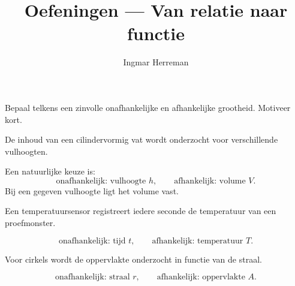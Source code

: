 \documentclass{ximera}
\title{Oefeningen — Van relatie naar functie}
\author{Ingmar Herreman}
\begin{document}









\maketitle

\FVDbeginExercises




\begin{oefening}{\oefB\ESS}

Bepaal telkens een zinvolle onafhankelijke en afhankelijke grootheid.
Motiveer kort.

\begin{question}
De inhoud van een cilindervormig vat wordt onderzocht voor verschillende
vulhoogten.

\begin{oplossing}
Een natuurlijke keuze is:
\[
\text{onafhankelijk: vulhoogte }h,
\qquad
\text{afhankelijk: volume }V.
\]
Bij een gegeven vulhoogte ligt het volume vast.
\end{oplossing}
\end{question}

\begin{question}
Een temperatuursensor registreert iedere seconde de temperatuur van een proefmonster.

\begin{oplossing}
\[
\text{onafhankelijk: tijd }t,
\qquad
\text{afhankelijk: temperatuur }T.
\]
\end{oplossing}
\end{question}

\begin{question}
Voor cirkels wordt de oppervlakte onderzocht in functie van de straal.

\begin{oplossing}
\[
\text{onafhankelijk: straal }r,
\qquad
\text{afhankelijk: oppervlakte }A.
\]
\end{oplossing}
\end{question}

\end{oefening}
\end{document}
